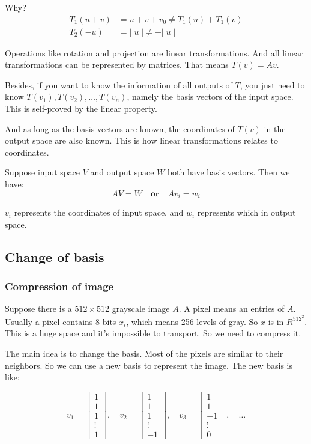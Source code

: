 \documentclass[12pt]{ctexart}
\begin{document}
Why?
\begin{align*}
  T_1(u + v) &= u + v + v_0 \neq T_1(u) + T_1(v) \\
  T_2(-u) &= ||u|| \neq -||u||
\end{align*}

Operations like rotation and projection are linear transformations. And all linear
transformations can be represented by matrices. That means $T(v) = Av$.

Besides, if you want to know the information of all outputs of $T$, you just need to
know $T(v_1), T(v_2), \ldots, T(v_n)$, namely the basis vectors of the input space.
This is self-proved by the linear property.

And as long as the basis vectors are known, the coordinates of $T(v)$ in the output space
are also known. This is how linear transformations relates to coordinates.

Suppose input space $V$ and output space $W$ both have basis vectors. Then we have:
\[
  AV = W \quad \textbf{or} \quad Av_i = w_i
\]

$v_i$ represents the coordinates of input space, and $w_i$ represents which in output space.

\subsection{\textbf{Change of basis}}
\subsubsection{\textbf{Compression of image}}
Suppose there is a $512 \times 512$ grayscale image $A$. A pixel means an entries of $A$.
Usually a pixel contains 8 bits $x_i$, which means 256 levels of gray. So $x$ is in $R^{512^2}$.
This is a huge space and it's impossible to transport. So we need to compress it.

The main idea is to change the basis. Most of the pixels are similar to their neighbors. So
we can use a new basis to represent the image. The new basis is like:

\[
  v_1 = \begin{bmatrix}
    1 \\ 1 \\ 1 \\ \vdots \\ 1
  \end{bmatrix}, \quad
  v_2 = \begin{bmatrix}
    1 \\ 1 \\ 1 \\ \vdots \\ -1
  \end{bmatrix}, \quad
  v_3 = \begin{bmatrix}
    1 \\ 1 \\ -1 \\ \vdots \\ 0
  \end{bmatrix}, \quad \ldots
\]
\end{document}
